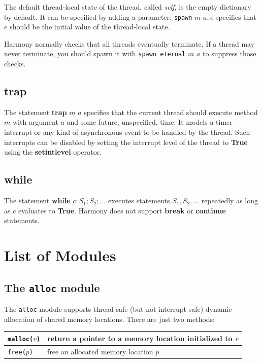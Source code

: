 \documentclass{report}
\begin{document}
The default thread-local state of the thread, called \textit{self},
is the empty dictionary by default.  It can be specified by adding
a parameter: \texttt{spawn} $m$ $a, e$ specifies that $e$ should be
the initial value of the thread-local state.

Harmony normally checks that all threads eventually terminate.
If a thread may never terminate, you should spawn it with
\texttt{spawn eternal} $m$ $a$ to suppress those checks.

\section{\textbf{trap}}

The statement \textbf{trap} $m$ $a$ specifies that the current thread
should execute method $m$ with argument $a$ and some future, unspecified,
time.  It models a timer interrupt or any kind of asynchronous event to
be handled by the thread.  Such interrupts can be disabled by setting
the interrupt level of the thread to \textbf{True} using the
\textbf{setintlevel} operator.

\section{\textbf{while}}

The statement \textbf{while} $c: S_1; S_2; ...$ executes statements
$S_1, S_2, ...$ repeatedly as long as $c$ evaluates to \textbf{True}.
Harmony does not support \textbf{break} or \textbf{continue} statements.

\chapter{List of Modules}
\label{ap:module}

\section{The \texttt{alloc} module}

The \texttt{alloc} module
%
supports thread-safe (but not interrupt-safe) dynamic allocation of
shared memory locations.  There are just two methods:

\vspace{1em}
\begin{tabular}{|l|l|}
\hline
\texttt{malloc($v$)} & return a pointer to a memory location initialized to $v$ \\
\hline
\texttt{free($p$)} & free an allocated memory location $p$ \\
\hline
\end{tabular}
\vspace{1em}
\end{document}
